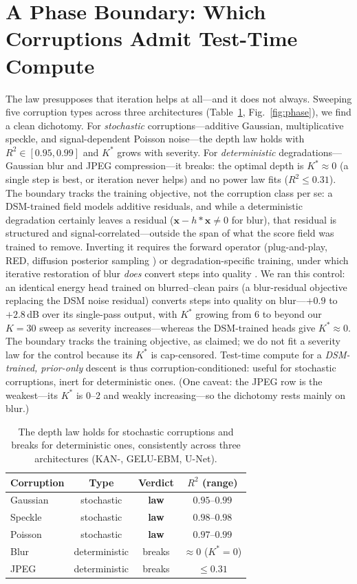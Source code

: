 \documentclass[letterpaper]{article}
\begin{document}
\section{A Phase Boundary: Which Corruptions Admit Test-Time Compute}
\label{sec:phase}
The law presupposes that iteration helps at all---and it does not always. Sweeping five corruption types
across three architectures (Table~\ref{tab:phase}, Fig.~\ref{fig:phase}), we find a clean dichotomy. For
\emph{stochastic} corruptions---additive Gaussian, multiplicative speckle, and signal-dependent Poisson
noise---the depth law holds with $R^{2}\in[0.95,0.99]$ and $K^{*}$ grows with severity. For
\emph{deterministic} degradations---Gaussian blur and JPEG compression---it breaks: the optimal depth is
$K^{*}\!\approx\!0$ (a single step is best, or iteration never helps) and no power law fits
($R^{2}\le0.31$). The boundary tracks the training objective, not the corruption class per se: a
DSM-trained field models additive residuals, and while a deterministic degradation certainly leaves a
residual ($\mathbf{x}-h\!*\!\mathbf{x}\neq0$ for blur), that residual is structured and
signal-correlated---outside the span of what the score field was trained to remove. Inverting it requires
the forward operator (plug-and-play, RED, diffusion posterior sampling
\citep{venkatakrishnan2013,romano2017,chung2023}) or degradation-specific training, under which iterative
restoration of blur \emph{does} convert steps into quality \citep{bansal2022,delbracio2023}. We ran this
control: an identical energy head trained on blurred--clean pairs (a blur-residual objective replacing
the DSM noise residual) converts steps into quality on blur---$+0.9$ to $+2.8$\,dB over its single-pass
output, with $K^{*}$ growing from $6$ to beyond our $K{=}30$ sweep as severity increases---whereas the
DSM-trained heads give $K^{*}\!\approx\!0$. The boundary tracks the training objective, as claimed; we do
not fit a severity law for the control because its $K^{*}$ is cap-censored. Test-time compute for a
\emph{DSM-trained, prior-only} descent is thus corruption-conditioned: useful for stochastic corruptions,
inert for deterministic ones. (One caveat: the JPEG row is the weakest---its $K^{*}$ is $0$--$2$ and
weakly increasing---so the dichotomy rests mainly on blur.)
\begin{table}[h]\centering
\begin{tabular}{lccc}
\toprule
Corruption & Type & Verdict & $R^{2}$ (range) \\
\midrule
Gaussian & stochastic & \textbf{law} & $0.95$--$0.99$ \\
Speckle & stochastic & \textbf{law} & $0.98$--$0.98$ \\
Poisson & stochastic & \textbf{law} & $0.97$--$0.99$ \\
Blur & deterministic & breaks & $\approx0$ ($K^{*}{=}0$) \\
JPEG & deterministic & breaks & $\le0.31$ \\
\bottomrule
\end{tabular}
\caption{The depth law holds for stochastic corruptions and breaks for deterministic ones, consistently
across three architectures (KAN-, GELU-EBM, U-Net).}
\label{tab:phase}
\end{table}
\end{document}
